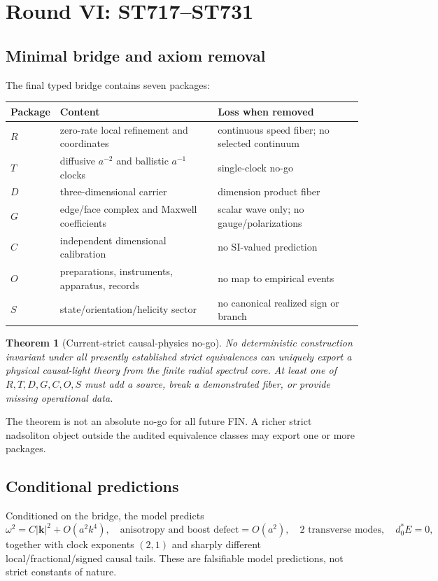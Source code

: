 \documentclass[11pt,a4paper]{article}
\newtheorem{theorem}{Theorem}[section]\newtheorem{corollary}[theorem]{Corollary}
\begin{document}
\section{Round VI: ST717--ST731}
\subsection{Minimal bridge and axiom removal}
The final typed bridge contains seven packages:
\begin{longtable}{@{}p{}p{}p{}@{}}\toprule Package&Content&Loss when removed\\\midrule\endhead
$R$&zero-rate local refinement and coordinates&continuous speed fiber; no selected continuum\\
$T$&diffusive $a^{-2}$ and ballistic $a^{-1}$ clocks&single-clock no-go\\
$D$&three-dimensional carrier&dimension product fiber\\
$G$&edge/face complex and Maxwell coefficients&scalar wave only; no gauge/polarizations\\
$C$&independent dimensional calibration&no SI-valued prediction\\
$O$&preparations, instruments, apparatus, records&no map to empirical events\\
$S$&state/orientation/helicity sector&no canonical realized sign or branch\\\bottomrule\end{longtable}

\begin{theorem}[Current-strict causal-physics no-go]
No deterministic construction invariant under all presently established strict equivalences can uniquely export a physical causal-light theory from the finite radial spectral core. At least one of $R,T,D,G,C,O,S$ must add a source, break a demonstrated fiber, or provide missing operational data.
\end{theorem}
The theorem is not an absolute no-go for all future FIN. A richer strict nadsoliton object outside the audited equivalence classes may export one or more packages.

\subsection{Conditional predictions}
Conditioned on the bridge, the model predicts
\[
\omega^2=C|\mathbf k|^2+O(a^2k^4),\quad
\text{anisotropy and boost defect}=O(a^2),\quad
2\text{ transverse modes},\quad d_0^*E=0,
\]
together with clock exponents $(2,1)$ and sharply different local/fractional/signed causal tails. These are falsifiable model predictions, not strict constants of nature.
\end{document}
